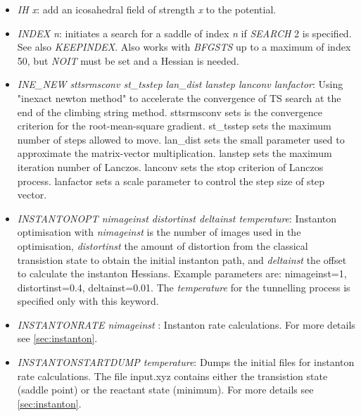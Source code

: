 \documentclass[12pt,a4paper,dvips]{article}
\begin{document}
\begin{itemize}
{\it nevl\/} is an integer that defines the largest number of iterations allowed in the
calculation of the largest Hessian eigenvalue; default 100. Not needed if {\it NOHESS\/}
of {\it NOIT\/} is set. 

\item {\it IH x\/}: add an icosahedral field of strength {\it x} to the potential.

\item {\it INDEX n\/}: initiates a search for a saddle of index {\it n\/} if
      {\it SEARCH\/} 2 is specified. See also {\it KEEPINDEX\/}. Also works with {\it BFGSTS\/}
      up to a maximum of index 50, but {\it NOIT\/} must be set and a Hessian is needed.

\item {\it INE\_NEW sttsrmsconv st\_tsstep lan\_dist lanstep lanconv lanfactor}: Using "inexact newton method" to accelerate the convergence of TS search at the end of the climbing string method. sttsrmsconv sets is the convergence criterion for the root-mean-square gradient. st\_tsstep sets the maximum number of steps allowed to move. lan\_dist sets the small parameter used to approximate the matrix-vector multiplication. lanstep sets the maximum iteration number of Lanczos. lanconv sets the stop criterion of Lanczos process. lanfactor sets a scale parameter to control the step size of step vector.

\item {\it INSTANTONOPT nimageinst distortinst deltainst temperature\/}: Instanton optimisation
with {\it nimageinst\/} is the number of images used in the optimisation, {\it distortinst\/} the amount of distortion from the classical transistion state to obtain the initial instanton path, and {\it deltainst\/} the offset to calculate the instanton Hessians. Example parameters are: nimageinst=1, distortinst=0.4, deltainst=0.01. The {\it temperature\/} for the tunnelling process is specified only with this keyword.

\item {\it INSTANTONRATE nimageinst \/}: Instanton rate calculations. For more details see \ref{sec:instanton}.

\item {\it INSTANTONSTARTDUMP temperature\/}: Dumps the initial files for instanton rate calculations. The file input.xyz contains either the transistion state (saddle point) or the reactant state (minimum). For more details see \ref{sec:instanton}.


\end{itemize}
\end{document}
